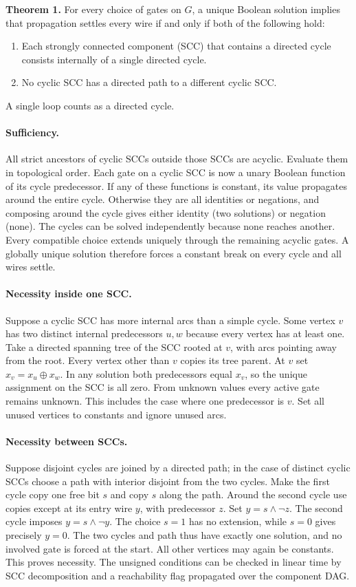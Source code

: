 \documentclass[11pt]{article}
\begin{document}
\textbf{Theorem 1.} For every choice of gates on $G$, a unique Boolean solution implies that propagation settles every wire if and only if both of the following hold:
\begin{enumerate}
\item Each strongly connected component (SCC) that contains a directed cycle consists internally of a single directed cycle.
\item No cyclic SCC has a directed path to a different cyclic SCC.
\end{enumerate}
A single loop counts as a directed cycle.

\paragraph{Sufficiency.} All strict ancestors of cyclic SCCs outside those SCCs are acyclic. Evaluate them in topological order. Each gate on a cyclic SCC is now a unary Boolean function of its cycle predecessor. If any of these functions is constant, its value propagates around the entire cycle. Otherwise they are all identities or negations, and composing around the cycle gives either identity (two solutions) or negation (none). The cycles can be solved independently because none reaches another. Every compatible choice extends uniquely through the remaining acyclic gates. A globally unique solution therefore forces a constant break on every cycle and all wires settle.

\paragraph{Necessity inside one SCC.} Suppose a cyclic SCC has more internal arcs than a simple cycle. Some vertex $v$ has two distinct internal predecessors $u,w$ because every vertex has at least one. Take a directed spanning tree of the SCC rooted at $v$, with arcs pointing away from the root. Every vertex other than $v$ copies its tree parent. At $v$ set $x_v=x_u\oplus x_w$. In any solution both predecessors equal $x_v$, so the unique assignment on the SCC is all zero. From unknown values every active gate remains unknown. This includes the case where one predecessor is $v$. Set all unused vertices to constants and ignore unused arcs.

\paragraph{Necessity between SCCs.} Suppose disjoint cycles are joined by a directed path; in the case of distinct cyclic SCCs choose a path with interior disjoint from the two cycles. Make the first cycle copy one free bit $s$ and copy $s$ along the path. Around the second cycle use copies except at its entry wire $y$, with predecessor $z$. Set $y=s\land\neg z$. The second cycle imposes $y=s\land\neg y$. The choice $s=1$ has no extension, while $s=0$ gives precisely $y=0$. The two cycles and path thus have exactly one solution, and no involved gate is forced at the start. All other vertices may again be constants. This proves necessity. The unsigned conditions can be checked in linear time by SCC decomposition and a reachability flag propagated over the component DAG.
\end{document}
